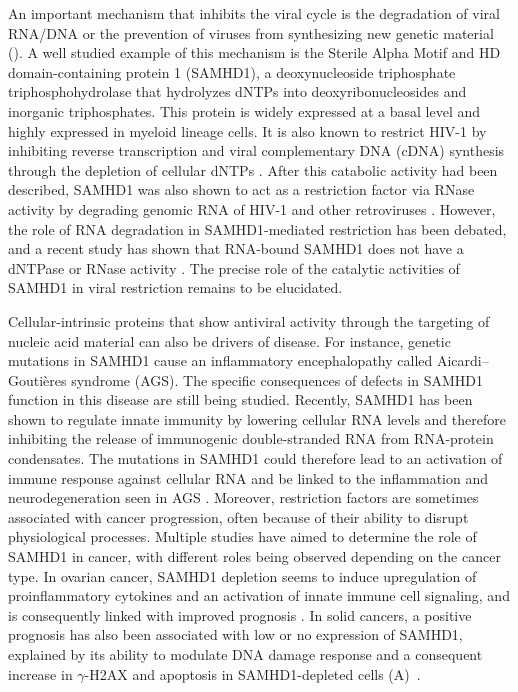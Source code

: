 \documentclass{enslyonreview}
\begin{document}
An important mechanism that inhibits the viral cycle is the degradation of viral RNA/DNA or
the prevention of viruses from synthesizing new genetic material ().
A well studied example of this mechanism is the Sterile Alpha Motif and HD domain-containing
protein 1 (SAMHD1), a deoxynucleoside triphosphate triphosphohydrolase that hydrolyzes dNTPs
into deoxyribonucleosides and inorganic triphosphates. This protein is widely expressed at a
basal level and highly expressed in myeloid lineage cells. It is also known to restrict HIV-1
by inhibiting reverse transcription and viral complementary DNA (cDNA) synthesis through the
depletion of cellular dNTPs \cite{goldstoneHIV1RestrictionFactor2011}. After this catabolic activity had been
described, SAMHD1 was also shown to act as a restriction factor via RNase activity by
degrading genomic RNA of HIV-1 and other retroviruses \cite{choiSAMHD1SpecificallyRestricts2015}. However, the role of
RNA degradation in SAMHD1-mediated restriction has been debated, and a recent study has shown
that RNA-bound SAMHD1 does not have a dNTPase or RNase activity \cite{orrisGuaninecontainingSsDNARNA2023}. The precise
role of the catalytic activities of SAMHD1 in viral restriction remains to be elucidated.

Cellular-intrinsic proteins that show antiviral activity through the targeting of nucleic
acid material can also be drivers of disease. For instance, genetic mutations in SAMHD1 cause
an inflammatory encephalopathy called Aicardi--Goutières syndrome (AGS). The specific
consequences of defects in SAMHD1 function in this disease are still being studied. Recently,
SAMHD1 has been shown to regulate innate immunity by lowering cellular RNA levels and
therefore inhibiting the release of immunogenic double-stranded RNA from RNA-protein
condensates. The mutations in SAMHD1 could therefore lead to an activation of immune response
against cellular RNA and be linked to the inflammation and neurodegeneration seen in AGS
\cite{maharanaSAMHD1ControlsInnate2022}. Moreover, restriction factors are sometimes associated with cancer
progression, often because of their ability to disrupt physiological processes. Multiple
studies have aimed to determine the role of SAMHD1 in cancer, with different roles being
observed depending on the cancer type. In ovarian cancer, SAMHD1 depletion seems to induce
upregulation of proinflammatory cytokines and an activation of innate immune cell signaling,
and is consequently linked with improved prognosis \cite{gutierrez-chamorroSAMHD1ExpressionModulates2023}. In solid
cancers, a positive prognosis has also been associated with low or no expression of SAMHD1,
explained by its ability to modulate DNA damage response and a consequent increase in
$\gamma$-H2AX and apoptosis in SAMHD1-depleted cells (A)~\cite{felipModulationDNADamage2022}.
\end{document}
